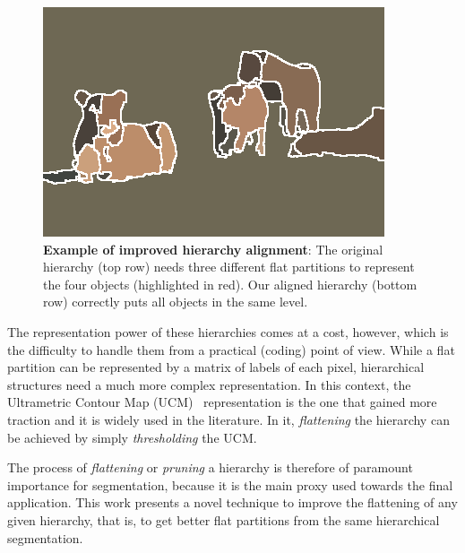 \begin{figure}
\begin{center}
\begin{minipage}{0.24\linewidth}
\includegraphics[width=\linewidth]{scale-aware/fig/aligned_lions/mcg_our_overseg.png}
\end{minipage}
\end{center}
\vspace{-2mm}
\caption{\textbf{Example of improved hierarchy alignment}: The original hierarchy (top row) needs three
different flat partitions to represent the four objects (highlighted in red).
Our aligned hierarchy (bottom row) correctly puts all objects in the same level.}
\vspace{-2mm}
\label{fig:thresh_seg}
\end{figure}

The representation power of these hierarchies comes at a cost, however, which is the
difficulty to handle them from a practical (coding) point of view.
While a flat partition can be represented by a matrix of labels of each pixel,
hierarchical structures need a much more complex representation. 
In this context, the Ultrametric Contour Map (UCM)~\cite{arbelaez2011contour} representation is the one that 
gained more traction and it is widely used in the literature.
In it, \textit{flattening} the hierarchy can be achieved by simply \textit{thresholding} the UCM.

The process of \textit{flattening} or \textit{pruning} a hierarchy is therefore of paramount importance for
segmentation, because it is the main proxy used towards the final application.
This work presents a novel technique to improve the flattening of any given hierarchy, that is, 
to get better flat partitions from the same hierarchical segmentation.

